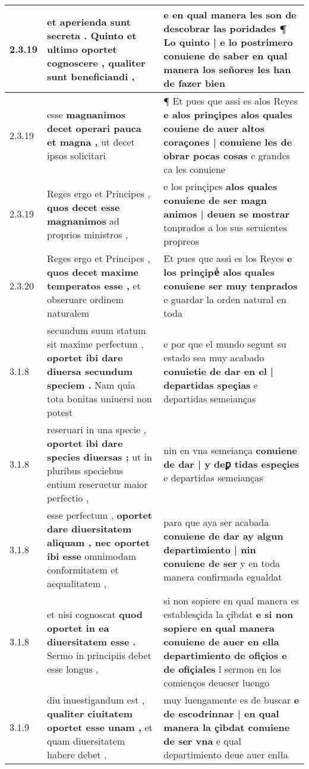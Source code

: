 \begin{tabular}{|p{1cm}|p{6.5cm}|p{6.5cm}|}
2.3.19 & et aperienda sunt secreta . \textbf{ Quinto et ultimo oportet cognoscere , } qualiter sunt beneficiandi , & e en qual manera les son de descobrar las poridades ¶ \textbf{ Lo quinto | e lo postrimero conuiene de saber } en qual manera los señores les han de fazer bien \\\hline
2.3.19 & esse \textbf{ magnanimos decet operari pauca et magna , } ut decet ipsos solicitari & ¶ Et pues que assi es alos Reyes \textbf{ e alos prinçipes alos quales couiene de auer altos coraçones | conuiene les de obrar pocas cosas } e grandes ca les conuiene \\\hline
2.3.19 & Reges ergo et Principes , \textbf{ quos decet esse magnanimos } ad proprios ministros , & e los prinçipes \textbf{ alos quales conuiene de ser magn animos | deuen se mostrar } tonprados a los sus seruientes propreos \\\hline
2.3.20 & Reges ergo et Principes , \textbf{ quos decet maxime temperatos esse , } et obseruare ordinem naturalem & Et pues que assi es los Reyes \textbf{ e los prinçipeᷤ alos quales conuiene ser muy tenprados } e guardar la orden natural en toda \\\hline
3.1.8 & secundum suum statum sit maxime perfectum , \textbf{ oportet ibi dare diuersa secundum speciem . } Nam quia tota bonitas uniuersi non potest & e por que el mundo segunt su estado sea muy acabado \textbf{ conuietie de dar en el | departidas speçias } e departidas semeianças \\\hline
3.1.8 & reseruari in una specie , \textbf{ oportet ibi dare species diuersas ; } ut in pluribus speciebus entium reseruetur maior perfectio , & nin en vna semeiança \textbf{ conuiene de dar | y deꝑ tidas espeçies } e departidas semeianças \\\hline
3.1.8 & esse perfectum , \textbf{ oportet dare diuersitatem aliquam , nec oportet ibi esse } omnimodam conformitatem et aequalitatem , & para que aya ser acabada \textbf{ conuiene de dar ay algun departimiento | nin conuiene de ser } y en toda manera confirmada egualdat \\\hline
3.1.8 & et nisi cognoscat \textbf{ quod oportet in ea diuersitatem esse . } Sermo in principiis debet esse longus , & si non sopiere en qual manera es establesçida la çibdat \textbf{ e si non sopiere en qual manera conuiene de auer en ella departimiento de ofiçios e de ofiçiales } l sermon en los comienços deueser luengo \\\hline
3.1.9 & diu inuestigandum est , \textbf{ qualiter ciuitatem oportet esse unam , } et quam diuersitatem habere debet , & muy luengamente es de buscar \textbf{ e de escodrinnar | en qual manera la çibdat conuiene de ser vna } e qual departimiento deue auer enlła \\\hline

\end{tabular}
